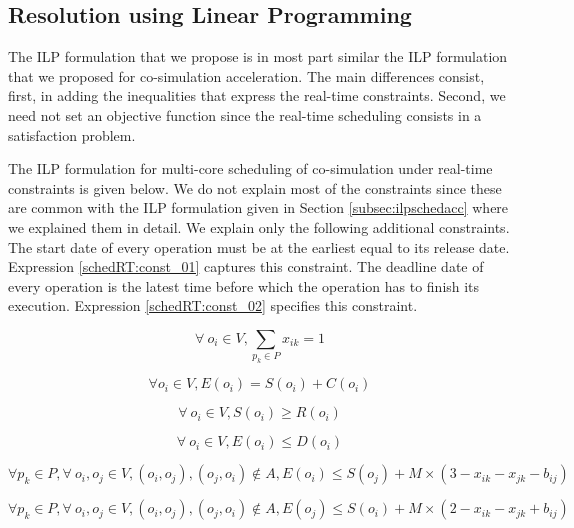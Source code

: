\subsection{Resolution using Linear Programming}

The ILP formulation that we propose is in most part similar the ILP formulation that we proposed for co-simulation acceleration. The main differences consist, first, in adding the inequalities that express the real-time constraints. Second, we need not set an objective function since the real-time scheduling consists in a satisfaction problem.

The ILP formulation for multi-core scheduling of co-simulation under real-time constraints is given below. We do not explain most of the constraints since these are common with the ILP formulation given in Section \ref{subsec:ilpschedacc} where we explained them in detail. We explain only the following additional constraints. The start date of every operation must be at the earliest equal to its release date. Expression \ref{schedRT:const_01} captures this constraint. The deadline date of every operation is the latest time before which the operation has to finish its execution. Expression \ref{schedRT:const_02} specifies this constraint.

\begin{equation}
\forall\ o_i \in V, \sum_{p_k \in P}x_{ik}=1
\label{schedRT:const_1}
\end{equation}

\begin{equation}
\forall o_i \in V, E(o_i) = S(o_i) + C(o_i)
\label{schedRT:const_2}
\end{equation}

\begin{equation}
\forall\ o_i \in V, S(o_i) \geq R(o_i)
\label{schedRT:const_01}
\end{equation}

\begin{equation}
\forall\ o_i \in V, E(o_i) \leq D(o_i)
\label{schedRT:const_02}
\end{equation}

\begin{equation}
\forall p_k \in P, \forall\ o_i, o_j \in V, (o_i,o_j), (o_j,o_i) \notin A, E(o_i) \leq S(o_j) + M \times (3 - x_{ik} - x_{jk} - b_{ij}) 
\label{schedRT:const_11}
\end{equation}

\begin{equation}
\forall p_k \in P, \forall\ o_i, o_j \in V, (o_i,o_j), (o_j,o_i) \notin A, E(o_j) \leq S(o_i) + M \times (2 - x_{ik} - x_{jk} + b_{ij}) 
\label{schedRT:const_12}
\end{equation}

